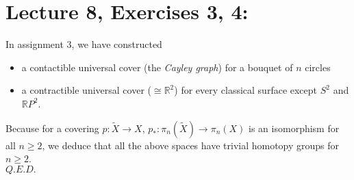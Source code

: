 \documentclass[11pt]{article}
\numberwithin{equation}{section}
\begin{document}
\section{\normalsize{Lecture 8, Exercises 3, 4:}}
In assignment 3, we have constructed 
\begin{itemize}
\item a contactible universal cover (the \emph{Cayley graph}) for a bouquet of $n$ circles 
\item a contractible universal cover ($\cong\mathbb{R}^2$) for every classical surface except $S^2$ and $\mathbb{R}P^2$. 
\end{itemize}
Because for a covering $p:\tilde{X}\rightarrow X$, $p_*:\pi_n(\tilde{X})\rightarrow \pi_n(X)$ is an isomorphism for all $n\geqslant 2$, we deduce that all the above spaces have trivial homotopy groups for $n\geqslant 2$. \\ $Q.E.D.$
\end{document}
